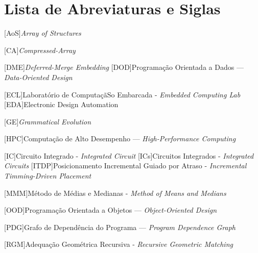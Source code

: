 \chapter * {Lista de Abreviaturas e Siglas}
\thispagestyle{empty}
\label{acro}


\begin{acronym}
\setlength{\parskip}{0ex}
\setlength{\itemsep}{1ex}


\renewcommand{\baselinestretch}{0.25}%
\large\normalsize%



[AoS]{\textit{Array of Structures}}

[CA]{\textit{Compressed-Array}} 

[DME]{\textit{Deferred-Merge Embedding}}
[DOD]{Programação Orientada a Dados --- \textit{Data-Oriented Design}}

[ECL]{Laboratório de ComputaçãSo Embarcada - \textit{Embedded Computing Lab}}
[EDA]{Electronic Design Automation}


[GE]{\textit{Grammatical Evolution}}

[HPC]{Computação de Alto Desempenho --- \textit{High-Performance Computing}}

[IC]{Circuito Integrado - \textit{Integrated Circuit}}
[ICs]{Circuitos Integrados - \textit{Integrated Circuits}}
[ITDP]{Posicionamento Incremental Guiado por Atraso - \textit{Incremental Timming-Driven Placement}}



[MMM]{Método de Médias e Medianas - \textit{Method of Means and Medians}}


[OOD]{Programação Orientada a Objetos --- \textit{Object-Oriented Design}}

[PDG]{Grafo de Dependência do Programa --- \textit{Program Dependence Graph}}

[RGM]{Adequação Geométrica Recursiva - \textit{Recursive Geometric Matching}}


\end{acronym}
